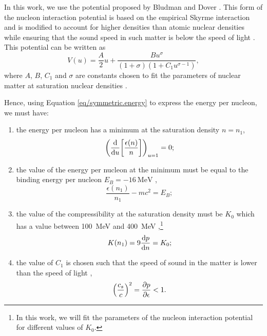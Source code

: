 \documentclass[draft,11pt]{article}
\theoremstyle{definition}
\theoremstyle{remark}
\begin{document}
                In this work, we use the potential proposed by Bludman and Dover \cite{bludman.dover.1980/extrapolation.skyrme.eos}. This form of the nucleon interaction potential is based on the empirical Skyrme interaction and is modified to account for higher densities than atomic nuclear densities while ensuring that the sound speed in such matter is below the speed of light \cite{bludman.dover.1980/extrapolation.skyrme.eos}. This potential can be written as \parencite{silbar.reddy.2004/neutron.stars} \begin{equation}\label{eq/symmetric.potential}V(u)=\frac{A}{2}u+\frac{Bu^{\sigma}}{(1+\sigma)(1+C_{1}u^{\sigma-1})},\end{equation} where $A$, $B$, $C_{1}$ and $\sigma$ are constants chosen to fit the parameters of nuclear matter at saturation nuclear densities \parencite{bludman.dover.1980/extrapolation.skyrme.eos}.
                
                Hence, using Equation \ref{eq/symmetric.energy} to express the energy per nucleon, we must have:
                \begin{enumerate}
                    \item the energy per nucleon has a minimum at the saturation density $n=n_{1}$, \begin{equation}\label{eq/symmetric.energy/saturation.minimum}\qty(\dv{u}\qty[\frac{\epsilon(n)}{n}])_{u=1}=0;\end{equation}
                    \item the value of the energy per nucleon at the minimum must be equal to the binding energy per nucleon $E_{B}=-\SI{16}{\mega\electronvolt}$ \parencite{silbar.reddy.2004/neutron.stars}, \begin{equation}\label{eq/symmetric.energy/binding.energy}\frac{\epsilon(n_{1})}{n_{1}}-mc^{2}=E_{B};\end{equation}
                    \item the value of the compressibility at the saturation density must be $K_{0}$ which has a value between \SI{100}{\mega\electronvolt} and \SI{400}{\mega\electronvolt} \parencite{silbar.reddy.2004/neutron.stars,prakash.ainsworth.lattimer.1988/eos},\footnote{In this work, we will fit the parameters of the nucleon interaction potential for different values of $K_{0}$.} \begin{equation}\label{eq/symmetric.energy/compressibility}K(n_{1})=9\dv{p}{n}=K_{0};\end{equation}
                    \item the value of $C_{1}$ is chosen such that the speed of sound in the matter is lower than the speed of light \parencite{bludman.dover.1980/extrapolation.skyrme.eos}, \begin{equation}\label{eq/symmetric.energy/speed.of.sound}\qty(\frac{c_{s}}{c})^{2}=\pdv{p}{\epsilon}<1.\end{equation}
                \end{enumerate}
\end{document}
